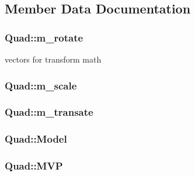 \subsection{Member Data Documentation}
\hypertarget{class_quad_a0f056585749e1e4af52ea80c9e450353}{}
\subsubsection[{m\+\_\+rotate}]{ Quad\+::m\+\_\+rotate}\label{class_quad_a0f056585749e1e4af52ea80c9e450353}


vectors for transform math 

\hypertarget{class_quad_a94d9fe0e5fa32916ab80f263a3dc43b4}{}
\subsubsection[{m\+\_\+scale}]{ Quad\+::m\+\_\+scale}\label{class_quad_a94d9fe0e5fa32916ab80f263a3dc43b4}
\hypertarget{class_quad_a71b5296b41053bfc400e08c579997c0f}{}
\subsubsection[{m\+\_\+transate}]{ Quad\+::m\+\_\+transate}\label{class_quad_a71b5296b41053bfc400e08c579997c0f}
\hypertarget{class_quad_a31981a73c8503bf906450ab2caadd32b}{}
\subsubsection[{Model}]{ Quad\+::\+Model}\label{class_quad_a31981a73c8503bf906450ab2caadd32b}
\hypertarget{class_quad_a412bc084a6c764c235b546be5fc4a7b6}{}
\subsubsection[{M\+V\+P}]{ Quad\+::\+M\+V\+P}\label{class_quad_a412bc084a6c764c235b546be5fc4a7b6}
\hypertarget{class_quad_afaed261444ab07e840d903baff5c0624}{}
